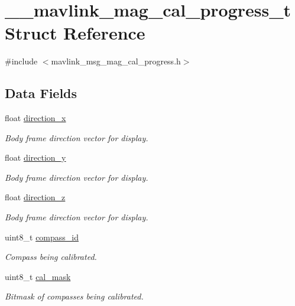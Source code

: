 \hypertarget{struct____mavlink__mag__cal__progress__t}{\section{\+\_\+\+\_\+mavlink\+\_\+mag\+\_\+cal\+\_\+progress\+\_\+t Struct Reference}
\label{struct____mavlink__mag__cal__progress__t}
}


{\ttfamily \#include $<$mavlink\+\_\+msg\+\_\+mag\+\_\+cal\+\_\+progress.\+h$>$}

\subsection*{Data Fields}
\begin{DoxyCompactItemize}
\item 
float \hyperlink{struct____mavlink__mag__cal__progress__t_a2f3d8129e9448ada15293a4487c8a6f4}{direction\+\_\+x}
\begin{DoxyCompactList}\small\item\em Body frame direction vector for display. \end{DoxyCompactList}\item 
float \hyperlink{struct____mavlink__mag__cal__progress__t_aa6d29bfcbbc29992ad49decba3ebfaca}{direction\+\_\+y}
\begin{DoxyCompactList}\small\item\em Body frame direction vector for display. \end{DoxyCompactList}\item 
float \hyperlink{struct____mavlink__mag__cal__progress__t_af156578adf97e273af5b880655c0f142}{direction\+\_\+z}
\begin{DoxyCompactList}\small\item\em Body frame direction vector for display. \end{DoxyCompactList}\item 
uint8\+\_\+t \hyperlink{struct____mavlink__mag__cal__progress__t_a1a66b3ff2022d636acd965f8e7cd9be8}{compass\+\_\+id}
\begin{DoxyCompactList}\small\item\em Compass being calibrated. \end{DoxyCompactList}\item 
uint8\+\_\+t \hyperlink{struct____mavlink__mag__cal__progress__t_ad4bfbc8fc9a8a2ae84478fd5879eb690}{cal\+\_\+mask}
\begin{DoxyCompactList}\small\item\em Bitmask of compasses being calibrated. \end{DoxyCompactList}\item 

\end{DoxyCompactItemize}
